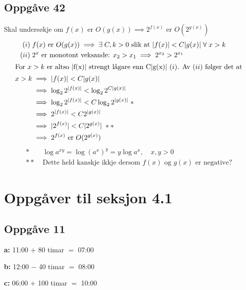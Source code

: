 \documentclass[a4paper, 11pt]{article}
\newcommand{\deloppg}[1]{\vspace{1mm}\noindent \textbf{\themecolor{#1:}}}
\newcommand{\themeshade}{Mahogany}
\newcommand{\themecolor}[1]{\textcolor{\themeshade}{#1}}
\begin{document}
\newpage
\subsection*{Oppgåve 42}
Skal undersøkje om \(f(x) \text{ er } O(g(x)) \implies 2^{f(x)} \text{ er } O(2^{g(x)})\)
\begin{align*}
    (i)\;& f(x) \text{ er } O(g(x)) \implies 
        \exists\; C, k > 0 \text{ slik at } |f(x)| < C|g(x)| \;\forall\; x > k \\
    (ii)\;& 2^x \text{ er monotont veksande: } x_2 > x_1 \implies 2^{x_2} > 2^{x_1} \\
    \intertext{For $x>k$ er altso |f(x)| strengt lågare enn C|g(x)| $(i)$. Av $(ii)$ følger det at}
    x > k & \implies |f(x)| < C|g(x)| \\
    & \implies \log_2 2^{|f(x)|} < \log_2 2^{C|g(x)|} \\
    & \implies \log_2 2^{|f(x)|} < C \log_2 2^{|g(x)|} \;*\\
    & \implies 2^{|f(x)|} < C 2^{|g(x)|} \\
    & \implies |2^{f(x)}| < C |2^{g(x)}| \;**\\
    & \implies 2^{f(x)} \text{ er } O(2^{g(x)})
\end{align*}
\begin{align*}
    * \;& \log a^{xy} = \log (a^x)^y = y\log a^x, \quad x,y > 0 \\
    **\;& \text{Dette held kanskje ikkje dersom $f(x)$ og $g(x)$ er negative?}
\end{align*}


\section{Oppgåver til seksjon 4.1}

\subsection*{Oppgåve 11}
\deloppg{a} 11:00 $+$ 80 timar $=$ 07:00

\deloppg{b} 12:00 $-$ 40 timar $=$ 08:00

\deloppg{c} 06:00 $+$ 100 timar $=$ 10:00
\end{document}
